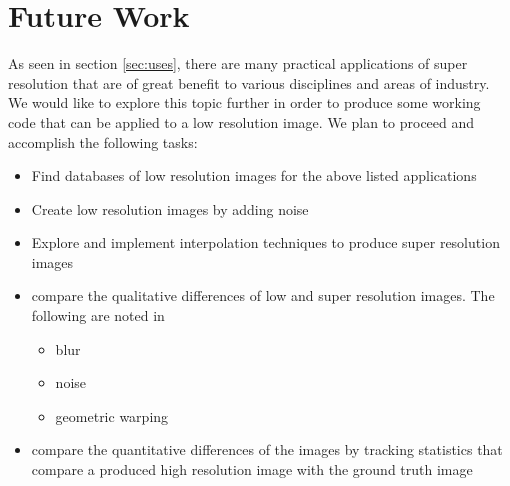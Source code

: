\documentclass{article}
\begin{document}
\section{Future Work}
\label{sec:future}
As seen in section \ref{sec:uses}, there are many practical
applications of super resolution that are of great benefit to various
disciplines and areas of industry. We would like to explore this topic
further in order to produce some working code that can be applied to a low
resolution image. We plan to proceed and accomplish the following
tasks:
\begin{itemize}
\item Find databases of low resolution images for the
  above listed applications
  \item Create low resolution images by adding noise
  \item Explore and implement interpolation techniques to produce
    super resolution images
    \item compare the qualitative differences of low and super
      resolution images. The following are noted in \cite{CapelMulti}
      \begin{itemize}
      \item blur
      \item  noise
      \item geometric warping
        
        \end{itemize}
      \item compare the quantitative differences of the images by
        tracking statistics that compare a produced high resolution image with
        the ground truth image 
\end{itemize}


\newpage
\printbibliography
\end{document}
